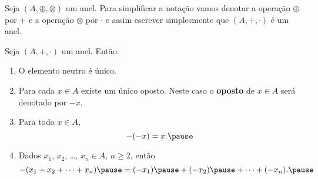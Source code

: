 \documentclass{beamer}
\begin{document}
    \begin{frame}
        \begin{observacao}
            Seja $(A, \oplus, \otimes)$ \pause um anel. \pause Para
            simplificar a nota\c{c}\~ao \pause vamos denotar a
            opera\c{c}\~ao $\oplus$ \pause por $+$ \pause e a
            opera\c{c}\~ao $\otimes$ \pause por $\cdot$ \pause e
            assim escrever simplesmente \pause que $(A, +, \cdot)$
            \pause \'e um anel.\pause
        \end{observacao}
    \end{frame}

    \begin{frame}
        \begin{proposicao}
            Seja $(A, + , \cdot)$ um anel. \pause Ent\~ao:\pause
            \begin{enumerate}[label={\roman*})]
                \item O elemento neutro {\'e} {\'u}nico.\pause

                \vspace{.5cm}

                \item Para cada $x \in A$ \pause existe um {\'u}nico
                    oposto. \pause Neste caso o \textbf{oposto} de
                    $x \in A$ \pause ser\'a denotado por $-x$.\pause

                \vspace{.5cm}

                \item Para todo $x \in A$, \pause
                \[
                    -(-x) = x.\pause
                \]

                \vspace{.5cm}

                \item Dados $x_{1}$, \pause $x_{2}$, \pause \dots,
                    $x_n \in A$, \pause $n \geqslant 2$, \pause
                    ent{\~a}o\pause
                \[
                    -(x_1 + x_2 + \dots + x_n) \pause = (-x_1) \pause
                    + (-x_2) \pause + \dots + (-x_n).\pause
                \]

                \vspace{.2cm}

                \seti
            \end{enumerate}
        \end{proposicao}
    \end{frame}
\end{document}
